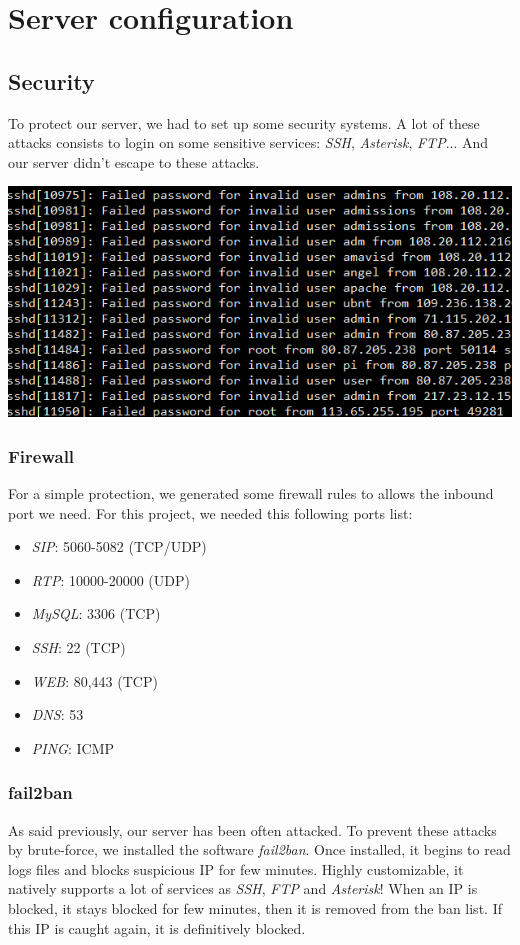 \chapter{Server configuration}

\section{Security}

To protect our server, we had to set up some security systems. A lot of these attacks consists to login on some sensitive services: \textit{SSH}, \textit{Asterisk}, \textit{FTP}... And our server didn't escape to these attacks. 

\includegraphics[width=1\textwidth]{img/sshattacks.png}

\subsection{Firewall}

For a simple protection, we generated some firewall rules to allows the inbound port we need. For this project, we needed this following ports list:
\begin{itemize}
\item \textit{SIP}: 5060-5082 (TCP/UDP)	
\item \textit{RTP}: 10000-20000 (UDP)
\item \textit{MySQL}: 3306 (TCP)
\item \textit{SSH}: 22 (TCP)
\item \textit{WEB}: 80,443 (TCP)
\item \textit{DNS}: 53 
\item \textit{PING}: ICMP
\end{itemize}

\subsection{fail2ban}
As said previously, our server has been often attacked. To prevent these attacks by brute-force, we installed the software \textit{fail2ban}. Once installed, it begins to read logs files and blocks suspicious IP for few minutes. Highly customizable, it natively supports a lot of services as \textit{SSH}, \textit{FTP} and \textit{Asterisk}! 
When an IP is blocked, it stays blocked for few minutes, then it is removed from the ban list. If this IP is caught again, it is definitively blocked.


